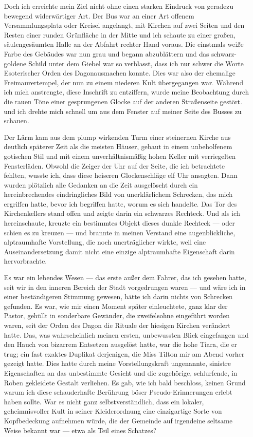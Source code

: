 Doch ich erreichte mein Ziel nicht ohne einen starken Eindruck von geradezu bewegend widerwärtiger Art. Der Bus war an einer Art offenem Versammlungsplatz oder Kreisel angelangt, mit Kirchen auf zwei Seiten und den Resten einer runden Grünfläche in der Mitte und ich schaute zu einer großen, säulengesäumten Halle an der Abfahrt rechter Hand voraus. Die einstmals weiße Farbe des Gebäudes war nun grau und begann abzublättern und das schwarz-goldene Schild unter dem Giebel war so verblasst, dass ich nur schwer die Worte \glqq Esoterischer
Orden des Dagon\grqq  ausmachen konnte. Dies war also der ehemalige Freimaurertempel, der nun zu einem niederen Kult übergegangen war. Während ich mich anstrengte, diese Inschrift zu entziffern, wurde meine Beobachtung durch die rauen Töne einer gesprungenen Glocke auf der anderen Straßenseite gestört. und ich drehte mich schnell um aus dem Fenster auf meiner Seite des Busses zu  schauen.

Der Lärm kam aus dem plump wirkenden Turm einer steinernen Kirche aus deutlich späterer Zeit als die meisten Häuser, gebaut in einem unbeholfenem gotischen Stil und mit einem unverhältnismäßig hohen Keller mit verriegelten Fensterläden. Obwohl die Zeiger der Uhr auf der Seite, die ich betrachtete fehlten, wusste ich, dass diese heiseren Glockenschläge elf Uhr ansagten. Dann wurden plötzlich alle Gedanken an die Zeit ausgelöscht durch ein hereinbrechendes eindringliches Bild von unerklärlichem Schrecken, das mich ergriffen hatte, bevor ich begriffen hatte, worum es sich handelte. Das Tor des Kirchenkellers stand offen und zeigte darin ein schwarzes Rechteck. Und als ich hereinschaute, kreuzte ein bestimmtes Objekt dieses dunkle Rechteck --- oder schien es zu kreuzen --- und brannte in meinen Verstand eine augenblickliche, alptraumhafte Vorstellung, die noch unerträglicher wirkte, weil eine Auseinandersetzung damit nicht eine einzige alptraumhafte Eigenschaft darin hervorbrachte.

Es war ein lebendes Wesen --- das erste außer dem Fahrer, das ich gesehen hatte, seit wir in den inneren Bereich der Stadt vorgedrungen waren --- und wäre ich in einer beständigeren Stimmung gewesen, hätte ich darin nichts von Schrecken gefunden. Es war, wie mir einen Moment später einleuchtete, ganz klar der Pastor, gehüllt in sonderbare Gewänder, die zweifelsohne eingeführt worden waren, seit der Orden des Dagon die Rituale der hiesigen Kirchen verändert hatte. Das, was wahrscheinlich meinen ersten, unbewussten Blick eingefangen und den Hauch von bizarrem Entsetzen ausgelöst hatte, war die hohe Tiara, die er trug; ein fast exaktes Duplikat derjenigen, die Miss Tilton mir am Abend vorher gezeigt hatte. Dies hatte durch meine Vorstellungskraft ungenannte, sinistre Eigenschaften an das unbestimmte Gesicht und die zugehörige, schlurfende, in Roben gekleidete Gestalt verliehen. Es gab, wie ich bald beschloss, keinen Grund warum ich diese schauderhafte Berührung böser Pseudo-Erinnerungen erlebt haben sollte. War es nicht ganz selbstverständlich, dass ein lokaler, geheimnisvoller Kult in seiner Kleiderordnung eine einzigartige Sorte von Kopfbedeckung aufnehmen würde, die der Gemeinde auf irgendeine seltsame Weise bekannt war --- etwa als Teil eines Schatzes?

